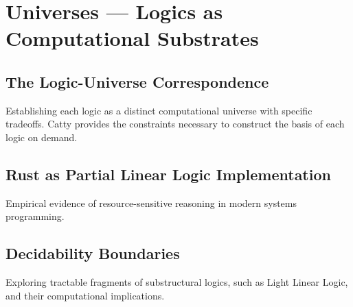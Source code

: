 
\chapter*{Universes --- Logics as Computational Substrates}

\section*{The Logic-Universe Correspondence}
Establishing each logic as a distinct computational universe with specific tradeoffs. Catty provides the constraints necessary to construct the basis of each logic on demand.

\section*{Rust as Partial Linear Logic Implementation}
Empirical evidence of resource-sensitive reasoning in modern systems programming.

\section*{Decidability Boundaries}
Exploring tractable fragments of substructural logics, such as Light Linear Logic, and their computational implications.
